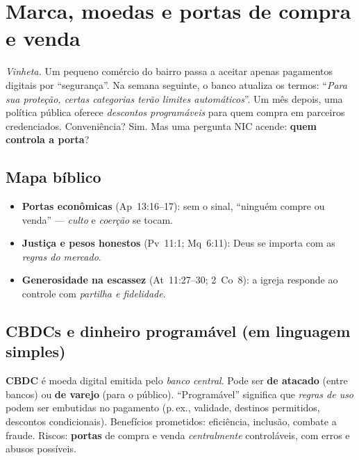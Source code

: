 \chapter{Marca, moedas e portas de compra e venda}
\noindent\textit{Vinheta.} Um pequeno comércio do bairro passa a aceitar apenas pagamentos digitais por ``segurança''. Na semana seguinte, o banco atualiza os termos: ``\emph{Para sua proteção, certas categorias terão limites automáticos}''. Um mês depois, uma política pública oferece \emph{descontos programáveis} para quem compra em parceiros credenciados. Conveniência? Sim. Mas uma pergunta NIC acende: \textbf{quem controla a porta}?

\section{Mapa bíblico}
\begin{itemize}[leftmargin=*,noitemsep]
  \item \textbf{Portas econômicas} (Ap~13:16--17): sem o sinal, ``ninguém compre ou venda'' --- \emph{culto} e \emph{coerção} se tocam.
  \item \textbf{Justiça e pesos honestos} (Pv~11:1; Mq~6:11): Deus se importa com as \emph{regras do mercado}.
  \item \textbf{Generosidade na escassez} (At~11:27--30; 2~Co~8): a igreja responde ao controle com \emph{partilha e fidelidade}.
\end{itemize}

\section{CBDCs e dinheiro programável (em linguagem simples)}
\textbf{CBDC} é moeda digital emitida pelo \emph{banco central}. Pode ser \textbf{de atacado} (entre bancos) ou \textbf{de varejo} (para o público). ``Programável'' significa que \emph{regras de uso} podem ser embutidas no pagamento (p.\,ex., validade, destinos permitidos, descontos condicionais). Benefícios prometidos: eficiência, inclusão, combate a fraude. Riscos: \textbf{portas} de compra e venda \emph{centralmente} controláveis, com erros e abusos possíveis.

